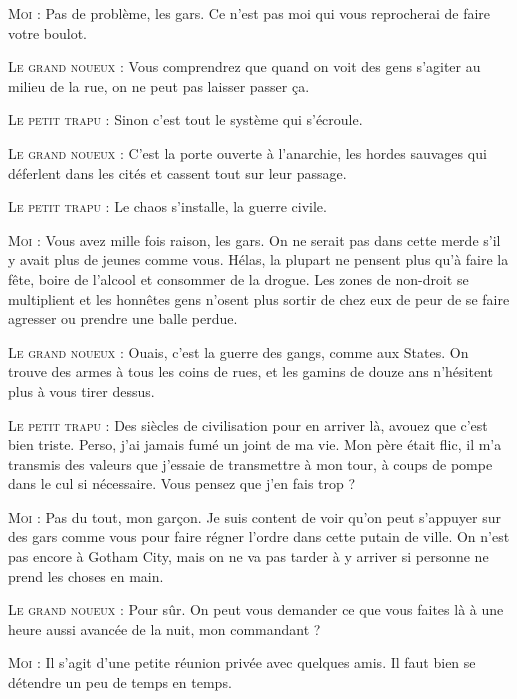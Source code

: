 \begin{dialogue}

\textsc{Moi} : Pas de problème, les gars. Ce n’est pas moi qui vous reprocherai de faire votre boulot.

\textsc{Le grand noueux} : Vous comprendrez que quand on voit des gens s’agiter au milieu de la rue, on ne peut pas laisser passer ça.

\textsc{Le petit trapu} : Sinon c’est tout le système qui s’écroule.

\textsc{Le grand noueux} : C’est la porte ouverte à l’anarchie, les hordes sauvages qui déferlent dans les cités et cassent tout sur leur passage.

\textsc{Le petit trapu} : Le chaos s’installe, la guerre civile.

\textsc{Moi} : Vous avez mille fois raison, les gars. On ne serait pas dans cette merde s’il y avait plus de jeunes comme vous. Hélas, la plupart ne pensent plus qu’à faire la fête, boire de l’alcool et consommer de la drogue. Les zones de non-droit se multiplient et les honnêtes gens n’osent plus sortir de chez eux de peur de se faire agresser ou prendre une balle perdue.

\textsc{Le grand noueux} : Ouais, c’est la guerre des gangs, comme aux States. On trouve des armes à tous les coins de rues, et les gamins de douze ans n’hésitent plus à vous tirer dessus.

\textsc{Le petit trapu} : Des siècles de civilisation pour en arriver là, avouez que c’est bien triste. Perso, j’ai jamais fumé un joint de ma vie. Mon père était flic, il m’a transmis des valeurs que j’essaie de transmettre à mon tour, à coups de pompe dans le cul si nécessaire. Vous pensez que j’en fais trop ?

\textsc{Moi} : Pas du tout, mon garçon. Je suis content de voir qu’on peut s’appuyer sur des gars comme vous pour faire régner l’ordre dans cette putain de ville. On n’est pas encore à Gotham City, mais on ne va pas tarder à y arriver si personne ne prend les choses en main.

\textsc{Le grand noueux} : Pour sûr. On peut vous demander ce que vous faites là à une heure aussi avancée de la nuit, mon commandant ?

\textsc{Moi} : Il s’agit d’une petite réunion privée avec quelques amis. Il faut bien se détendre un peu de temps en temps.


\end{dialogue}
